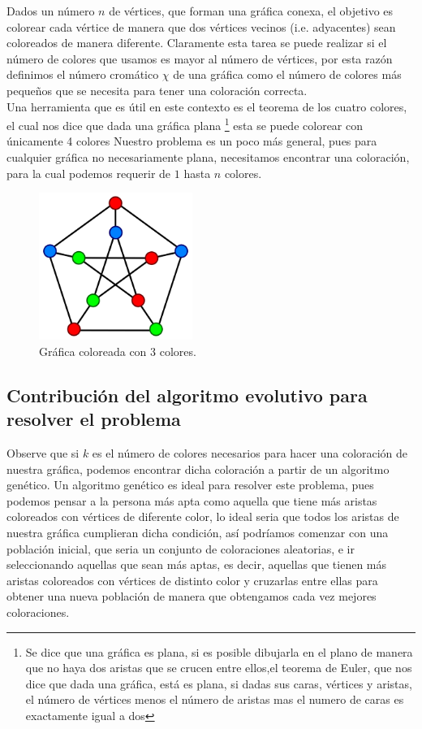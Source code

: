 \documentclass{article}
\begin{document}
Dados un n\'umero $n$ de v\'ertices, que forman una gr\'afica conexa, el objetivo es colorear cada v\'ertice de manera que dos v\'ertices vecinos (i.e. adyacentes) sean coloreados de manera diferente. Claramente esta tarea se puede realizar si el número de colores que usamos es mayor al número de vértices, por esta razón definimos el número cromático $\chi$ de una gráfica como el número de colores más pequeños que se necesita para tener una coloración correcta.\cite{Prugel-Bennett, A. 2003. Genetic algorithm for graph coloring} \\ 

Una herramienta que es útil en este contexto es el teorema de los cuatro colores, el cual nos dice que dada una gráfica plana \footnote{Se dice que una gráfica es plana, si es posible dibujarla en el plano de manera que no haya dos aristas que se crucen entre ellos,el teorema de Euler, que nos dice que dada una gráfica, está es plana, si dadas sus caras, vértices y aristas, el número de vértices menos el número de aristas mas el numero de caras es exactamente igual a dos} esta se puede colorear con únicamente 4 colores\cite{Prugel-Bennett, A. 2003. Genetic algorithm for graph coloring}
Nuestro problema es un poco más general, pues para cualquier gráfica no necesariamente plana, necesitamos encontrar una coloración, para la cual podemos requerir de $1$ hasta $n$ colores.
\begin{figure}[h!]
    \centering
    \includegraphics[width=5cm]{imgs/graph_3color.png}
    \caption{Gráfica coloreada con 3 colores.}
    \label{fig:my_label}
\end{figure}

\subsection{Contribución del algoritmo evolutivo para resolver el problema}
Observe que si $k$ es el número de colores necesarios para hacer una coloración de nuestra gráfica, podemos encontrar dicha coloración a partir de un algoritmo genético.
Un algoritmo genético es ideal para resolver este problema, pues podemos pensar a la persona más apta como aquella que tiene más aristas coloreados con vértices de diferente color, lo ideal seria que todos los aristas de nuestra gráfica cumplieran dicha condición, así podríamos comenzar con una población inicial, que seria un conjunto de coloraciones aleatorias, e ir seleccionando aquellas que sean más aptas, es decir, aquellas que tienen más aristas coloreados con vértices de distinto color y cruzarlas entre ellas para obtener una nueva población de manera que obtengamos cada vez mejores coloraciones.
\end{document}
